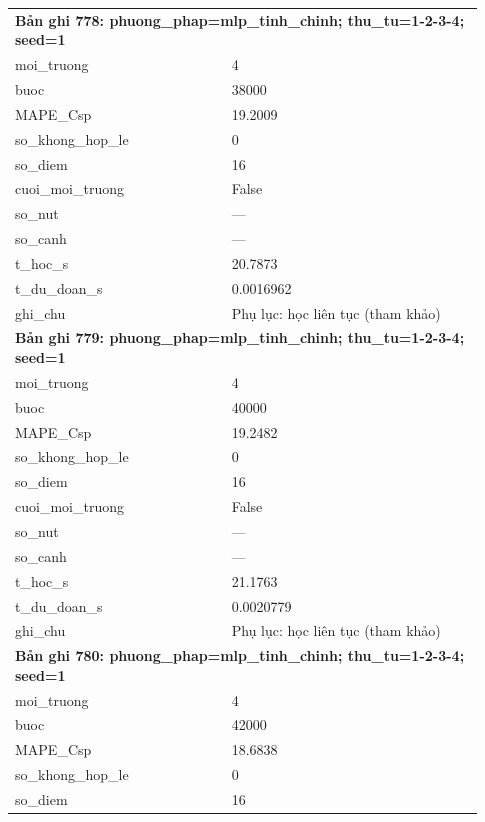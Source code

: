 \begin{longtable}{p{0.43\linewidth}p{0.50\linewidth}}
\midrule
\multicolumn{2}{p{0.95\linewidth}}{\textbf{Bản ghi 778: phuong\_phap=mlp\_tinh\_chinh; thu\_tu=1-2-3-4; seed=1}} \\
moi\_\allowbreak truong & 4 \\
buoc & 38000 \\
MAPE\_\allowbreak Csp & 19.2009 \\
so\_\allowbreak khong\_\allowbreak hop\_\allowbreak le & 0 \\
so\_\allowbreak diem & 16 \\
cuoi\_\allowbreak moi\_\allowbreak truong & False \\
so\_\allowbreak nut & — \\
so\_\allowbreak canh & — \\
t\_\allowbreak hoc\_\allowbreak s & 20.7873 \\
t\_\allowbreak du\_\allowbreak doan\_\allowbreak s & 0.0016962 \\
ghi\_\allowbreak chu & Phụ lục: học liên tục (tham khảo) \\
\midrule
\multicolumn{2}{p{0.95\linewidth}}{\textbf{Bản ghi 779: phuong\_phap=mlp\_tinh\_chinh; thu\_tu=1-2-3-4; seed=1}} \\
moi\_\allowbreak truong & 4 \\
buoc & 40000 \\
MAPE\_\allowbreak Csp & 19.2482 \\
so\_\allowbreak khong\_\allowbreak hop\_\allowbreak le & 0 \\
so\_\allowbreak diem & 16 \\
cuoi\_\allowbreak moi\_\allowbreak truong & False \\
so\_\allowbreak nut & — \\
so\_\allowbreak canh & — \\
t\_\allowbreak hoc\_\allowbreak s & 21.1763 \\
t\_\allowbreak du\_\allowbreak doan\_\allowbreak s & 0.0020779 \\
ghi\_\allowbreak chu & Phụ lục: học liên tục (tham khảo) \\
\midrule
\multicolumn{2}{p{0.95\linewidth}}{\textbf{Bản ghi 780: phuong\_phap=mlp\_tinh\_chinh; thu\_tu=1-2-3-4; seed=1}} \\
moi\_\allowbreak truong & 4 \\
buoc & 42000 \\
MAPE\_\allowbreak Csp & 18.6838 \\
so\_\allowbreak khong\_\allowbreak hop\_\allowbreak le & 0 \\
so\_\allowbreak diem & 16 \\

\end{longtable}
